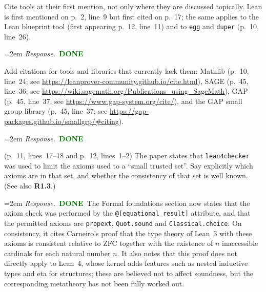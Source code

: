 \documentclass[11pt]{amsart}
\newcommand{\done}{\textcolor{green}{\textbf{DONE}}}
\newcommand{\response}[1]{%
  \par\smallskip
  \noindent\hangindent=2em\hangafter=1
  \textit{Response.}\ #1
  \par\smallskip}
\begin{document}
\begin{requests}

\item Cite tools at their first mention, not only where they are discussed topically.
Lean is first mentioned on p.~2, line~9 but first cited on p.~17; the same applies to
the Lean blueprint tool (first appearing p.~12, line~11) and to \texttt{egg} and
\texttt{duper} (p.~10, line~26).
\response{\done}

\item Add citations for tools and libraries that currently lack them: Mathlib
(p.~10, line~24; see \url{https://leanprover-community.github.io/cite.html}),
SAGE (p.~45, line~36; see \url{https://wiki.sagemath.org/Publications_using_SageMath}),
GAP (p.~45, line~37; see \url{https://www.gap-system.org/cite/}), and the GAP small
group library (p.~45, line~37; see \url{https://gap-packages.github.io/smallgrp/#citing}).
\response{\done}

\item (p.~11, lines~17--18 and p.~12, lines~1--2) The paper states that
\texttt{lean4checker} was used to limit the axioms used to a ``small trusted set''.
Say explicitly which axioms are in that set, and whether the consistency of that set
is well known. (See also \textbf{R1.3}.)
\response{\done\ The Formal foundations section now states that the axiom check was performed by the \texttt{@{[}equational\_result{]}} attribute, and that the permitted axioms are \texttt{propext}, \texttt{Quot.sound} and \texttt{Classical.choice}. On consistency, it cites Carneiro's proof that the type theory of Lean~3 with these axioms is consistent relative to ZFC together with the existence of $n$ inaccessible cardinals for each natural number $n$. It also notes that this proof does not directly apply to Lean~4, whose kernel adds features such as nested inductive types and eta for structures; these are believed not to affect soundness, but the corresponding metatheory has not been fully worked out.}


\end{requests}
\end{document}
